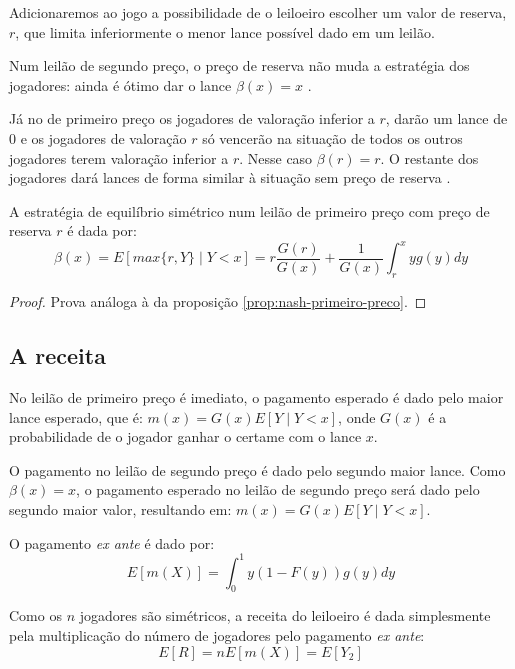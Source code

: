 Adicionaremos ao jogo a possibilidade de o leiloeiro escolher um valor de reserva, $r$, que limita inferiormente o menor lance possível dado em um leilão.

Num leilão de segundo preço, o preço de reserva não muda a estratégia dos jogadores: ainda é ótimo dar o lance $\beta(x) = x$ \citet{krishna}.

Já no de primeiro preço os jogadores de valoração inferior a $r$, darão um lance de $0$ e os jogadores de valoração $r$ só vencerão na situação de todos os outros jogadores terem valoração inferior a $r$. Nesse caso $\beta(r) = r$. O restante dos jogadores dará lances de forma similar à situação sem preço de reserva \citet{krishna}.

\begin{proposicao}
	A estratégia de equilíbrio simétrico num leilão de primeiro preço com preço de reserva $r$ é dada por:
	\begin{equation}
		\beta(x) = E[max\{r, Y\} \mid Y < x] = r\frac{G(r)}{G(x)} + \frac{1}{G(x)} \int_r^x yg(y)dy
	\end{equation}
\end{proposicao}
\begin{proof}
	Prova análoga à da proposição \ref{prop:nash-primeiro-preco}.
\end{proof}

\subsection{A receita}

No leilão de primeiro preço é imediato, o pagamento esperado é dado pelo maior lance esperado, que é: $m(x) = G(x)E\left[ Y \mid Y<x \right]$, onde $G(x)$ é a probabilidade de o jogador ganhar o certame com o lance $x$.

O pagamento no leilão de segundo preço é dado pelo segundo maior lance. Como $\beta(x) = x$, o pagamento esperado no leilão de segundo preço será dado pelo segundo maior valor, resultando em: $m(x) = G(x)E\left[ Y \mid Y<x \right]$.

O pagamento \emph{ex ante} é dado por:
\begin{equation*}
	E[m(X)] = \int_0^1 y(1-F(y))g(y)dy
\end{equation*}

Como os $n$ jogadores são simétricos, a receita do leiloeiro é dada simplesmente pela multiplicação do número de jogadores pelo pagamento \emph{ex ante}:
\begin{equation*}
	E[R] = nE[m(X)] = E[Y_2]
\end{equation*}

